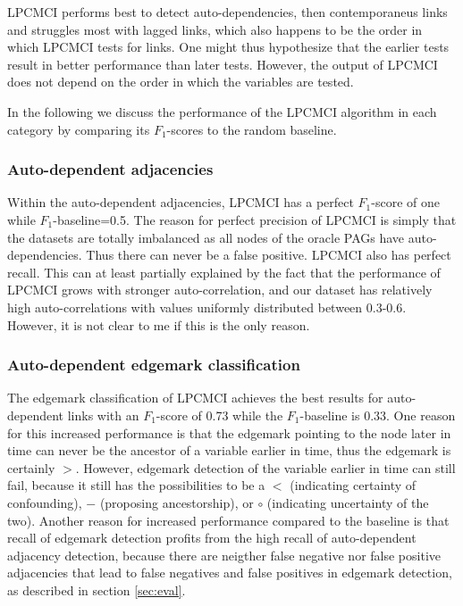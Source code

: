 \documentclass[conference]{IEEEtran}
\begin{document}
LPCMCI performs best to detect auto-dependencies, then contemporaneus links and struggles most with lagged links, which also happens to be the order in which LPCMCI tests for links. One might thus hypothesize  that the earlier tests result in better performance than later tests. However, the output of LPCMCI does not depend on the order in which the variables are tested\cite{gerhardus_high-recall_2021}.

In the following we discuss the performance of the LPCMCI algorithm in each category by comparing its $F_1$-scores to the random baseline.
\subsubsection{Auto-dependent adjacencies}
Within the auto-dependent adjacencies, LPCMCI has a perfect $F_1$-score of one while $F_1$-baseline=0.5. The reason for perfect precision of LPCMCI is simply that the datasets are totally imbalanced as all nodes of the oracle PAGs have auto-dependencies. Thus there can never be a false positive.
LPCMCI also has perfect recall. This can at least partially explained by the fact that the performance of LPCMCI grows with stronger auto-correlation\cite{gerhardus_high-recall_2021}, and our dataset has relatively high auto-correlations with values uniformly distributed between 0.3-0.6. However, it is not clear to me if this is the only reason.

\subsubsection{Auto-dependent edgemark classification}
The edgemark classification of LPCMCI achieves the best results for auto-dependent links with an $F_1$-score of 0.73 while the $F_1$-baseline is 0.33. One reason for this increased performance is that the edgemark pointing to the node later in time can never be the ancestor of a variable earlier in time, thus the edgemark is certainly $>$. 
However, edgemark detection of the variable earlier in time can still fail, because it still has the possibilities to be a $<$ (indicating certainty of confounding), $-$ (proposing ancestorship), or $\circ$ (indicating uncertainty of the two).
Another reason for increased performance compared to the baseline is that recall of edgemark detection profits from the high recall of auto-dependent adjacency detection, because there are neigther false negative nor false positive adjacencies that lead to false negatives and false positives in edgemark detection, as described in section \ref{sec:eval}.
\end{document}
